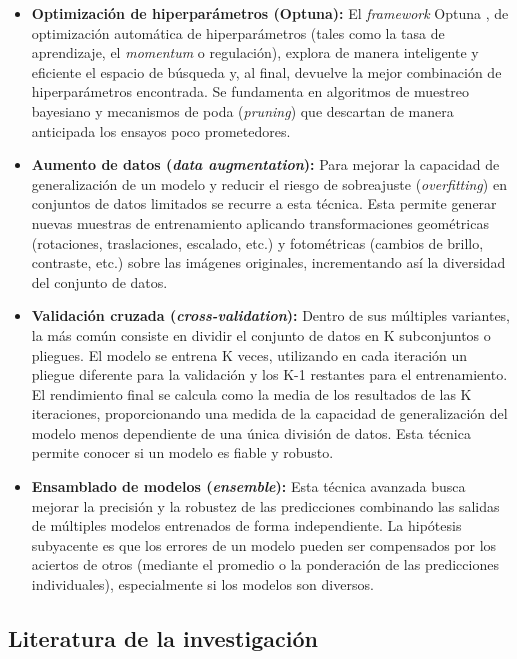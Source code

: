 \documentclass[12pt,a4paper,onecolumn,oneside]{report}
\begin{document}
\begin{itemize}
  \item \textbf{Optimización de hiperparámetros (Optuna):} El \textit{framework} Optuna \cite{optuna_github}, de optimización automática de hiperparámetros (tales como la tasa de aprendizaje, el \textit{momentum} o regulación), 
  explora de manera inteligente y eficiente el espacio de búsqueda y, al final, devuelve la mejor combinación de hiperparámetros encontrada. Se fundamenta en algoritmos de muestreo bayesiano y mecanismos de poda (\textit{pruning}) 
  que descartan de manera anticipada los ensayos poco prometedores.
  \item \textbf{Aumento de datos (\textit{data augmentation}):} Para mejorar la capacidad de generalización de un modelo y reducir el riesgo de sobreajuste (\textit{overfitting}) en conjuntos de datos limitados se recurre a esta técnica. 
  Esta permite generar nuevas muestras de entrenamiento aplicando transformaciones geométricas (rotaciones, traslaciones, escalado, etc.) y fotométricas (cambios de brillo, contraste, etc.) sobre las imágenes originales, 
  incrementando así la diversidad del conjunto de datos.
  \item \textbf{Validación cruzada (\textit{cross-validation}):} Dentro de sus múltiples variantes, la más común consiste en dividir el conjunto de datos en K subconjuntos o pliegues. El modelo se entrena K veces, 
  utilizando en cada iteración un pliegue diferente para la validación y los K-1 restantes para el entrenamiento. El rendimiento final se calcula como la media de los resultados de las K iteraciones, proporcionando una medida de la capacidad 
  de generalización del modelo menos dependiente de una única división de datos. Esta técnica permite conocer si un modelo es fiable y robusto.
  \item \textbf{Ensamblado de modelos (\textit{ensemble}):} Esta técnica avanzada busca mejorar la precisión y la robustez de las predicciones combinando las salidas de múltiples modelos entrenados de forma independiente. 
  La hipótesis subyacente es que los errores de un modelo pueden ser compensados por los aciertos de otros (mediante el promedio o la ponderación de las predicciones individuales), especialmente si los modelos son diversos.
\end{itemize}

\subsection{Literatura de la investigación}
\end{document}
